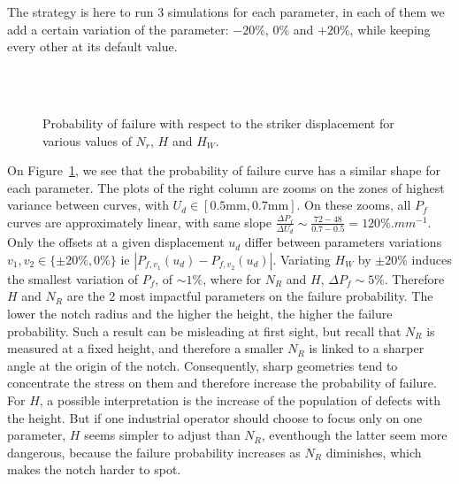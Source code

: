 \documentclass[
10pt, %
a4paper, %
oneside, %
headinclude,footinclude, %
BCOR5mm, %
]{scrartcl}
\begin{document}
The strategy is here to run $3$ simulations for each parameter,
in each of them we add a certain variation of the parameter: $-20\%$, $0\%$ and $+20\%$,
while keeping every other at its default value.

\begin{figure}[H]
    \centering
    \hfill
    \\
    \hfill
    \\
    \hfill

    \caption{Probability of failure with respect to the striker displacement for
        various values of $N_r$, $H$ and $H_W$.}
    \label{fig:param-var}
\end{figure}

On Figure~\ref{fig:param-var}, we see that the probability of failure curve
has a similar shape for each parameter. The plots of the right column are zooms
on the zones of highest variance between curves, with $U_d \in [0.5 \text{mm}, 0.7 \text{mm}]$.
On these zooms, all $P_f$ curves are approximately linear, with same slope
$\frac{\Delta P_f}{\Delta U_d} \sim \frac{72-48}{0.7-0.5} = 120 \%.mm^{-1}$.
Only the offsets at a given displacement $u_d$ differ between parameters variations $v_1,v_2 \in \{\pm 20\%, 0\%\}$ ie
$|P_{f,v_1}(u_d) - P_{f,v_2}(u_d)|$.
Variating $H_W$ by $\pm 20\%$ induces the smallest variation of $P_f$, of $\sim 1\%$,
where for $N_R$ and $H$, $\Delta P_f \sim 5\%$.
Therefore $H$ and $N_R$ are the 2 most impactful parameters on the failure probability.
The lower the notch radius and the higher the height, the higher the failure
probability.
Such a result can be misleading at first sight, but recall that
$N_R$ is measured at a fixed height, and therefore
a smaller $N_R$ is linked to a sharper angle at the origin of the notch.
Consequently, sharp geometries tend to concentrate the stress on them and therefore
increase the probability of failure.
For $H$, a possible interpretation is the increase of the population
of defects with the height.
But if one industrial operator should choose to focus only
on one parameter, $H$ seems simpler to
adjust than $N_R$, eventhough the latter seem more dangerous, because
the failure probability increases as $N_R$ diminishes, which makes
the notch harder to spot.
\end{document}
